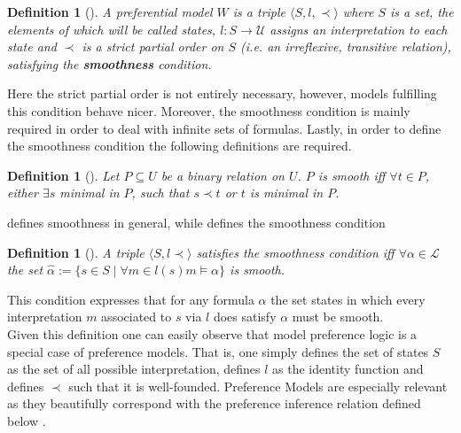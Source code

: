 \documentclass{article}
\newtheorem{mydef}[thm]{Definition}
\begin{document}
\begin{mydef}[\cite{kraus1990nonmonotonic}]
A preferential model $W$ is a triple $\langle S,l, \prec \rangle$ where $S$ is a set, the elements of which will be called states, $l:S \to \mathcal{U}$ assigns an interpretation to each state and $\prec$ is a strict partial order on $S$ (i.e.  an irreflexive, transitive relation), satisfying the \textbf{smoothness} condition.
\end{mydef} 

Here the strict partial order is not entirely necessary, however, models fulfilling this condition behave nicer. Moreover, the smoothness condition is mainly required in order to deal with infinite sets of formulas. Lastly, in order to define the smoothness condition the following definitions are required. 

\begin{mydef}[\cite{kraus1990nonmonotonic}]
Let $P \subseteq U$ be a binary relation on $U$. $P$ is smooth iff $\forall t \in P$, either $\exists s$ minimal in $P$, such that $s \prec t$ or $t$ is minimal in $P$.
\end{mydef} 

defines smoothness in general, while defines the smoothness condition


\begin{mydef}[\cite{kraus1990nonmonotonic}]
A triple $\langle S, l \prec \rangle$ satisfies the smoothness condition iff $\forall \alpha \in \mathcal{L}$ the set $\widehat{\alpha}:= \{s \in S \mid \forall m \in l(s) m \models \alpha\}$ is smooth. 
\end{mydef} 

This condition expresses that for any formula $\alpha$ the set states in which every interpretation $m$ associated to $s$ via $l$ does satisfy $\alpha$ must be smooth. \\
Given this definition one can easily observe that model preference logic is a special case of preference models. That is, one simply defines the set of states $S$ as the set of all possible interpretation, defines $l$ as the identity function and defines $\prec$ such that it is well-founded. Preference Models are especially relevant as they beautifully correspond with the preference inference relation defined below \cite{kraus1990nonmonotonic}.
\end{document}

